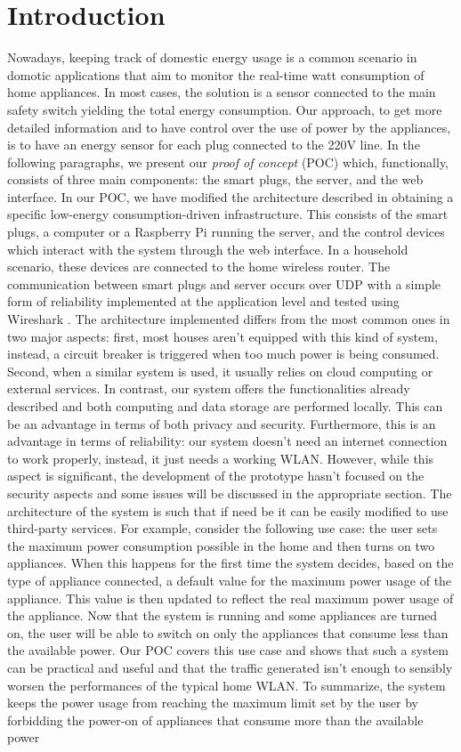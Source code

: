 \documentclass[conference]{IEEEtran}
\begin{document}
	\section{Introduction}
	Nowadays, keeping track of domestic energy usage is a common scenario in domotic applications that aim to monitor the real-time watt consumption of home appliances. In most cases, the solution is a sensor connected to the main safety switch yielding the total energy consumption. Our approach, to get more detailed information and to have control over the use of power by the appliances, is to have an energy sensor for each plug connected to the 220V line. In the following paragraphs, we present our \textit{proof of concept} (POC) which, functionally, consists of three main components: the smart plugs, the server, and the web interface. In our POC, we have modified the architecture described in \cite{8110428} obtaining a specific low-energy consumption-driven infrastructure. This consists of the smart plugs, a computer or a Raspberry Pi running the server, and the control devices which interact with the system through the web interface. In a household scenario, these devices are connected to the home wireless router. The communication between smart plugs and server occurs over UDP with a simple form of reliability implemented at the application level and tested using Wireshark \cite{wireshark}. The architecture implemented differs from the most common ones in two major aspects: first, most houses aren't equipped with this kind of system, instead, a circuit breaker is triggered when too much power is being consumed. Second, when a similar system is used, it usually relies on cloud computing or external services. In contrast, our system offers the functionalities already described and both computing and data storage are performed locally. This can be an advantage in terms of both privacy and security. Furthermore, this is an advantage in terms of reliability: our system doesn't need an internet connection to work properly, instead, it just needs a working WLAN. However, while this aspect is significant, the development of the prototype hasn't focused on the security aspects and some issues will be discussed in the appropriate section. The architecture of the system is such that if need be it can be easily modified to use third-party services. For example, consider the following use case: the user sets the maximum power consumption possible in the home and then turns on two appliances. When this happens for the first time the system decides, based on the type of appliance connected, a default value for the maximum power usage of the appliance. This value is then updated to reflect the real maximum power usage of the appliance. Now that the system is running and some appliances are turned on, the user will be able to switch on only the appliances that consume less than the available power. Our POC covers this use case and shows that such a system can be practical and useful and that the traffic generated isn't enough to sensibly worsen the performances of the typical home WLAN. To summarize, the system keeps the power usage from reaching the maximum limit set by the user by forbidding the power-on of appliances that consume more than the available power 
\end{document}
